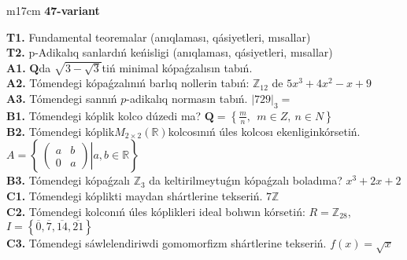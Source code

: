 \documentclass{article}
\begin{document}
\begin{tabular}{m{17cm}}
\textbf{47-variant}
\newline

\textbf{T1.} Fundamental teoremalar (anıqlaması, qásiyetleri, mısallar) \\
\textbf{T2.} p-Adikalıq sanlardıń keńisligi (anıqlaması, qásiyetleri, mısallar) \\
\textbf{A1.} \(\mathbf{Q}\)da \(\sqrt{3 - \sqrt{3}}\)tiń minimal kópaǵzalısın tabıń. \\
\textbf{A2.} Tómendegi kópaǵzalınıń barlıq nollerin tabıń: \(\mathbb{Z}_{12}\) de \(5x^{3} + 4x^{2} - x + 9\) \\
\textbf{A3.} Tómendegi sannıń \(p\)-adikalıq normasın tabıń. \(|729|_{3} =\) \\
\textbf{B1.} Tómendegi kóplik kolco dúzedi ma? \(\mathbf{Q} = \left\{ \frac{m}{n},\ \ m \in Z,\ n \in N \right\}\) \\
\textbf{B2.} Tómendegi kóplik\(M_{2 \times 2}\left( \mathbb{R} \right)\)kolcosınıń úles kolcosı ekenliginkórsetiń. \(A = \left\{ \left. \ \begin{pmatrix}
a & b \\
0 & a
\end{pmatrix} \right|a,b\mathbb{\in R} \right\}\) \\
\textbf{B3.} Tómendegi kópaǵzalı \(\mathbb{Z}_{3}\) da keltirilmeytuǵın kópaǵzalı boladıma? \(x^{3} + 2x + 2\) \\
\textbf{C1.} Tómendegi kóplikti maydan shártlerine tekseriń. \(7\mathbb{Z}\) \\
\textbf{C2.} Tómendegi kolconıń úles kóplikleri ideal bolıwın kórsetiń:
\(R = \mathbb{Z}_{28}\), \(I = \left\{ \overline{0},\overline{7},\overline{14},\overline{21} \right\}\) \\
\textbf{C3.} Tómendegi sáwlelendiriwdi gomomorfizm shártlerine tekseriń. \(f(x) = \sqrt{x}\) \\

\end{tabular}
\vspace{1cm}
\end{document}
